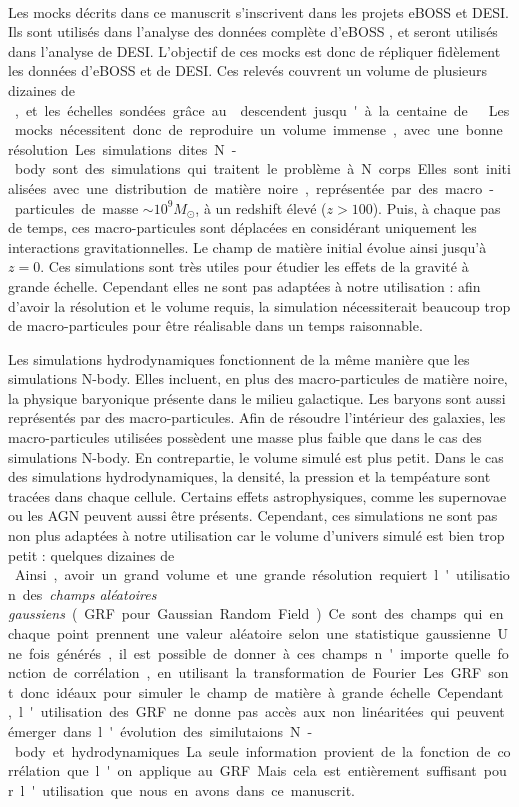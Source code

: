 \documentclass[11pt, twoside, a4paper, openright]{report}
\begin{document}
\paragraph{}
Les mocks décrits dans ce manuscrit s'inscrivent dans les projets eBOSS et DESI. Ils sont utilisés dans l'analyse \lya{} des données complète d'eBOSS \citep{CITE:dr16}, et seront utilisés dans l'analyse \lya{} de DESI.
L'objectif de ces mocks est donc de répliquer fidèlement les données \lya{} d'eBOSS et de DESI. Ces relevés couvrent un volume de plusieurs dizaines de \si{\perh\cubic\Gpc}, et les échelles sondées grâce au \lya{} descendent jusqu'à la centaine de \si{\perh\kpc}. Les mocks nécessitent donc de reproduire un volume immense, avec une bonne résolution.
Les simulations dites N-body sont des simulations qui traitent le problème à N corps. Elles sont initialisées avec une distribution de matière noire, représentée par des macro-particules de masse $\sim 10^{9} M_{\odot}$, à un redshift élevé ($z > 100$). Puis, à chaque pas de temps, ces macro-particules sont déplacées en considérant uniquement les interactions gravitationnelles. Le champ de matière initial évolue ainsi jusqu'à $z=0$. Ces simulations sont très utiles pour étudier les effets de la gravité à grande échelle. Cependant elles ne sont pas adaptées à notre utilisation : afin d'avoir la résolution et le volume requis, la simulation nécessiterait beaucoup trop de macro-particules pour être réalisable dans un temps raisonnable.

Les simulations hydrodynamiques fonctionnent de la même manière que les simulations N-body. Elles incluent, en plus des macro-particules de matière noire, la physique baryonique présente dans le milieu galactique. Les baryons sont aussi représentés par des macro-particules. Afin de résoudre l'intérieur des galaxies, les macro-particules utilisées possèdent une masse plus faible que dans le cas des simulations N-body. En contrepartie, le volume simulé est plus petit. Dans le cas des simulations hydrodynamiques, la densité, la pression et la tempéature sont tracées dans chaque cellule. Certains effets astrophysiques, comme les supernovae ou les AGN peuvent aussi être présents. Cependant, ces simulations ne sont pas non plus adaptées à notre utilisation car le volume d'univers simulé est bien trop petit : quelques dizaines de \si{\perh\cubic\Mpc}.

Ainsi, avoir un grand volume et une grande résolution requiert l'utilisation des \emph{champs aléatoires gaussiens} (GRF pour Gaussian Random Field). Ce sont des champs qui en chaque point prennent une valeur aléatoire selon une statistique gaussienne. Une fois générés, il est possible de donner à ces champs n'importe quelle fonction de corrélation, en utilisant la transformation de Fourier. Les GRF sont donc idéaux pour simuler le champ de matière à grande échelle. Cependant, l'utilisation des GRF ne donne pas accès aux non linéaritées qui peuvent émerger dans l'évolution des similutaions N-body et hydrodynamiques. La seule information provient de la fonction de corrélation que l'on applique au GRF. Mais cela est entièrement suffisant pour l'utilisation que nous en avons dans ce manuscrit.
\end{document}
